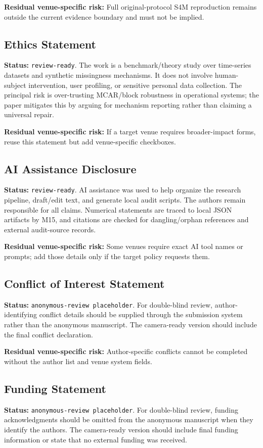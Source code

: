 \documentclass[10pt]{article}
\begin{document}
\textbf{Residual venue-specific risk:} Full original-protocol S4M reproduction remains outside the current evidence boundary and must not be implied.

\subsection{Ethics Statement}
\textbf{Status:} \texttt{review-ready}. The work is a benchmark/theory study over time-series datasets and synthetic missingness mechanisms. It does not involve human-subject intervention, user profiling, or sensitive personal data collection. The principal risk is over-trusting MCAR/block robustness in operational systems; the paper mitigates this by arguing for mechanism reporting rather than claiming a universal repair.

\textbf{Residual venue-specific risk:} If a target venue requires broader-impact forms, reuse this statement but add venue-specific checkboxes.

\subsection{AI Assistance Disclosure}
\textbf{Status:} \texttt{review-ready}. AI assistance was used to help organize the research pipeline, draft/edit text, and generate local audit scripts. The authors remain responsible for all claims. Numerical statements are traced to local JSON artifacts by M15, and citations are checked for dangling/orphan references and external audit-source records.

\textbf{Residual venue-specific risk:} Some venues require exact AI tool names or prompts; add those details only if the target policy requests them.

\subsection{Conflict of Interest Statement}
\textbf{Status:} \texttt{anonymous-review placeholder}. For double-blind review, author-identifying conflict details should be supplied through the submission system rather than the anonymous manuscript. The camera-ready version should include the final conflict declaration.

\textbf{Residual venue-specific risk:} Author-specific conflicts cannot be completed without the author list and venue system fields.

\subsection{Funding Statement}
\textbf{Status:} \texttt{anonymous-review placeholder}. For double-blind review, funding acknowledgments should be omitted from the anonymous manuscript when they identify the authors. The camera-ready version should include final funding information or state that no external funding was received.
\end{document}
